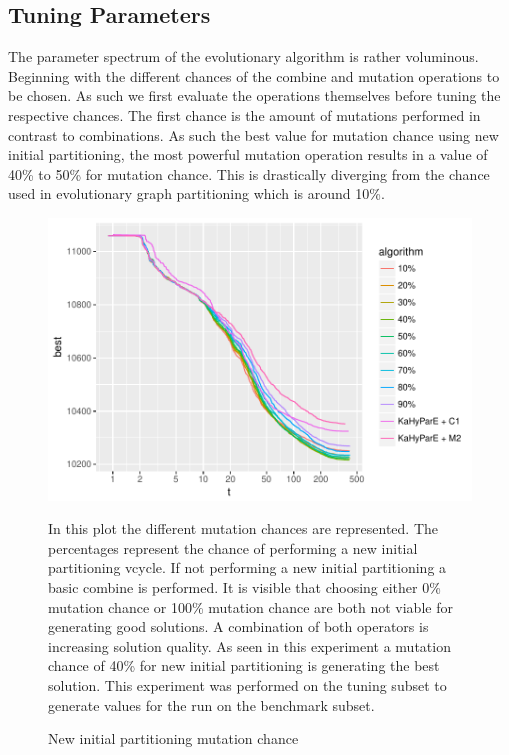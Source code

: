 \documentclass[a4paper,12pt,bibtotoc,titlepage, liststotoc,BCOR7mm,headsepline,pointlessnumbers]{scrbook}
\numberwithin{equation}{section}
\begin{document}
\subsection{Tuning Parameters}
The parameter spectrum of the evolutionary algorithm is rather voluminous. Beginning with the different chances of the combine and mutation operations to be chosen. As such we first evaluate the operations themselves before tuning the respective chances. The first chance is the amount of mutations performed in contrast to combinations. As such the best value for mutation chance using new initial partitioning, the most powerful mutation operation results in a value of 40\% to 50\% for mutation chance. This is drastically diverging from the chance used in evolutionary graph partitioning which is around 10\%. \cite{sanders2012distributed}
\begin{figure}[H]
\caption{New initial partitioning mutation chance}
\begin{center}
\includegraphics{bachelorarbeit-newipmutationchance}
\end{center}
In this plot the different mutation chances are represented. The percentages represent the chance of performing a new initial partitioning vcycle. If not performing a new initial partitioning a basic combine is performed. It is visible that choosing either 0\% mutation chance or 100\% mutation chance are both not viable for generating good solutions. A combination of both operators is increasing solution quality. As seen in this experiment a mutation chance of 40\% for new initial partitioning is generating the best solution. This experiment was performed on the tuning subset to generate values for the run on the benchmark subset.
\end{figure}
\end{document}
